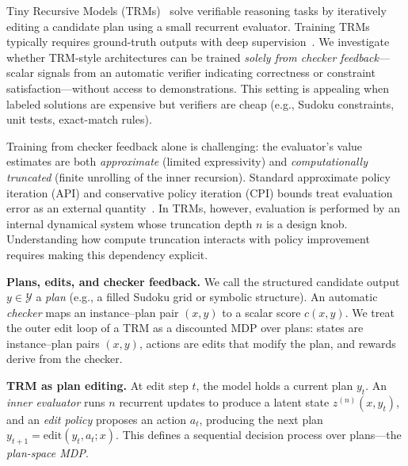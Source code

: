 \documentclass{article}
\theoremstyle{plain}
\theoremstyle{definition}
\theoremstyle{remark}
\newcommand{\YY}{\mathcal{Y}}
\begin{document}
Tiny Recursive Models (TRMs)~\citep{TRM2025} solve verifiable reasoning tasks by iteratively editing a candidate plan using a small recurrent evaluator.
Training TRMs typically requires ground-truth outputs with deep supervision~\citep{TRM2025}.
We investigate whether TRM-style architectures can be trained \emph{solely from checker feedback}---scalar signals from an automatic verifier indicating correctness or constraint satisfaction---without access to demonstrations.
This setting is appealing when labeled solutions are expensive but verifiers are cheap (e.g., Sudoku constraints, unit tests, exact-match rules).

Training from checker feedback alone is challenging: the evaluator's value estimates are both \emph{approximate} (limited expressivity) and \emph{computationally truncated} (finite unrolling of the inner recursion).
Standard approximate policy iteration (API) and conservative policy iteration (CPI) bounds treat evaluation error as an external quantity~\citep{BertsekasTsitsiklis1996,KakadeLangford2002}.
In TRMs, however, evaluation is performed by an internal dynamical system whose truncation depth $n$ is a design knob.
Understanding how compute truncation interacts with policy improvement requires making this dependency explicit.

\textbf{Plans, edits, and checker feedback.}
We call the structured candidate output $y \in \YY$ a \emph{plan} (e.g., a filled Sudoku grid or symbolic structure).
An automatic \emph{checker} maps an instance--plan pair $(x,y)$ to a scalar score $c(x,y)$.
We treat the outer edit loop of a TRM as a discounted MDP over plans: states are instance--plan pairs $(x,y)$, actions are edits that modify the plan, and rewards derive from the checker.

\textbf{TRM as plan editing.}
At edit step $t$, the model holds a current plan $y_t$.
An \emph{inner evaluator} runs $n$ recurrent updates to produce a latent state $z^{(n)}(x,y_t)$, and an \emph{edit policy} proposes an action $a_t$, producing the next plan $y_{t+1}=\mathrm{edit}(y_t,a_t;x)$.
This defines a sequential decision process over plans---the \emph{plan-space MDP}.
\end{document}
